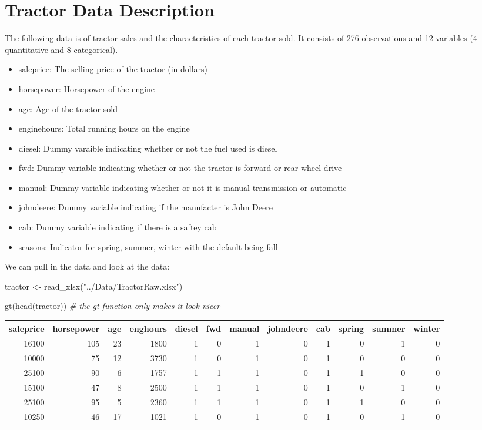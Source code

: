 \documentclass[
]{article}
\newenvironment{Shaded}{\begin{snugshade}}{\end{snugshade}}
\newcommand{\CommentTok}[1]{\textcolor[rgb]{0.56,0.35,0.01}{\textit{#1}}}
\newcommand{\FunctionTok}[1]{\textcolor[rgb]{0.00,0.00,0.00}{#1}}
\newcommand{\NormalTok}[1]{#1}
\newcommand{\OtherTok}[1]{\textcolor[rgb]{0.56,0.35,0.01}{#1}}
\newcommand{\StringTok}[1]{\textcolor[rgb]{0.31,0.60,0.02}{#1}}
\providecommand{\tightlist}{%
  \setlength{\itemsep}{0pt}\setlength{\parskip}{0pt}}
\begin{document}
\hypertarget{tractor-data-description}{%
\section{Tractor Data Description}\label{tractor-data-description}}

The following data is of tractor sales and the characteristics of each
tractor sold. It consists of 276 observations and 12 variables (4
quantitative and 8 categorical).

\begin{itemize}
\tightlist
\item
  saleprice: The selling price of the tractor (in dollars)
\item
  horsepower: Horsepower of the engine
\item
  age: Age of the tractor sold
\item
  enginehours: Total running hours on the engine
\item
  diesel: Dummy varaible indicating whether or not the fuel used is
  diesel
\item
  fwd: Dummy variable indicating whether or not the tractor is forward
  or rear wheel drive
\item
  manual: Dummy variable indicating whether or not it is manual
  transmission or automatic
\item
  johndeere: Dummy variable indicating if the manufacter is John Deere
\item
  cab: Dummy variable indicating if there is a saftey cab
\item
  seasons: Indicator for spring, summer, winter with the default being
  fall
\end{itemize}

We can pull in the data and look at the data:

\begin{Shaded}
\begin{Highlighting}[]
\NormalTok{tractor }\OtherTok{\textless{}{-}} \FunctionTok{read\_xlsx}\NormalTok{(}\StringTok{"../Data/TractorRaw.xlsx"}\NormalTok{)}

\FunctionTok{gt}\NormalTok{(}\FunctionTok{head}\NormalTok{(tractor)) }\CommentTok{\# the gt function only makes it look nicer}
\end{Highlighting}
\end{Shaded}

\begin{longtable}{rrrrrrrrrrrr}
\toprule
saleprice & horsepower & age & enghours & diesel & fwd & manual & johndeere & cab & spring & summer & winter \\ 
\midrule
16100 & 105 & 23 & 1800 & 1 & 0 & 1 & 0 & 1 & 0 & 1 & 0 \\ 
10000 & 75 & 12 & 3730 & 1 & 0 & 1 & 0 & 1 & 0 & 0 & 0 \\ 
25100 & 90 & 6 & 1757 & 1 & 1 & 1 & 0 & 1 & 1 & 0 & 0 \\ 
15100 & 47 & 8 & 2500 & 1 & 1 & 1 & 0 & 1 & 0 & 1 & 0 \\ 
25100 & 95 & 5 & 2360 & 1 & 1 & 1 & 0 & 1 & 1 & 0 & 0 \\ 
10250 & 46 & 17 & 1021 & 1 & 0 & 1 & 0 & 1 & 0 & 1 & 0 \\ 
\bottomrule
\end{longtable}
\end{document}
